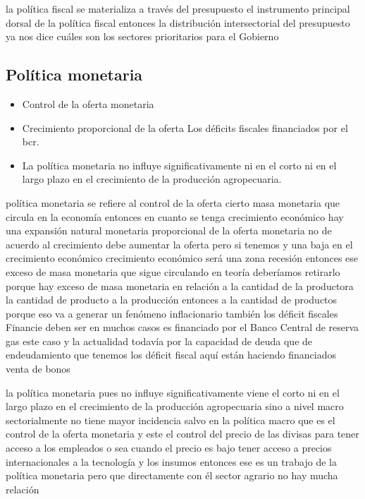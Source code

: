 \documentclass[
  letterpaper,
  DIV=11,
  numbers=noendperiod]{scrartcl}
\begin{document}
la política fiscal se materializa a través del presupuesto el
instrumento principal dorsal de la política fiscal entonces la
distribución intersectorial del presupuesto ya nos dice cuáles son los
sectores prioritarios para el Gobierno

\hypertarget{poluxedtica-monetaria}{%
\subsection{Política monetaria}\label{poluxedtica-monetaria}}

\begin{itemize}
\item
  Control de la oferta monetaria
\item
  Crecimiento proporcional de la oferta Los déficits fiscales
  financiados por el bcr.
\item
  La política monetaria no influye significativamente ni en el corto ni
  en el largo plazo en el crecimiento de la producción agropecuaria.
\end{itemize}

política monetaria se refiere al control de la oferta cierto masa
monetaria que circula en la economía entonces en cuanto se tenga
crecimiento económico hay una expansión natural monetaria proporcional
de la oferta monetaria no de acuerdo al crecimiento debe aumentar la
oferta pero si tenemos y una baja en el crecimiento económico
crecimiento económico será una zona recesión entonces ese exceso de masa
monetaria que sigue circulando en teoría deberíamos retirarlo porque hay
exceso de masa monetaria en relación a la cantidad de la productora la
cantidad de producto a la producción entonces a la cantidad de productos
porque eso va a generar un fenómeno inflacionario también los déficit
fiscales Financie deben ser en muchos casos es financiado por el Banco
Central de reserva gas este caso y la actualidad todavía por la
capacidad de deuda que de endeudamiento que tenemos los déficit fiscal
aquí están haciendo financiados venta de bonos

la política monetaria pues no influye significativamente viene el corto
ni en el largo plazo en el crecimiento de la producción agropecuaria
sino a nivel macro sectorialmente no tiene mayor incidencia salvo en la
política macro que es el control de la oferta monetaria y este el
control del precio de las divisas para tener acceso a los empleados o
sea cuando el precio es bajo tener acceso a precios internacionales a la
tecnología y los insumos entonces ese es un trabajo de la política
monetaria pero que directamente con él sector agrario no hay mucha
relación
\end{document}
